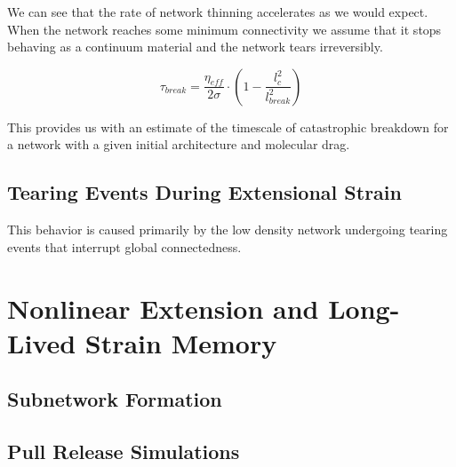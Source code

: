 \documentclass[pre,reprint]{revtex4-1}
\begin{document}
We can see that the rate of network thinning accelerates as we would expect.  When the network reaches some minimum connectivity we assume that it stops behaving as a continuum material and the network tears irreversibly.  

\begin{equation}
\tau_{break} = \frac{\eta_{eff}}{2\sigma}\cdot\left ( 1 -\frac{l_c^2}{l_{break}^2} \right )
\end{equation}

This provides us with an estimate of the timescale of catastrophic breakdown for a network with a given initial architecture and molecular drag.


\subsection{Tearing Events During Extensional Strain}

This behavior is caused primarily by the low density network undergoing tearing events that interrupt global connectedness.  















































\section{Nonlinear Extension and Long-Lived Strain Memory}

\subsection{Subnetwork Formation}

\subsection{Pull Release Simulations}
\end{document}
